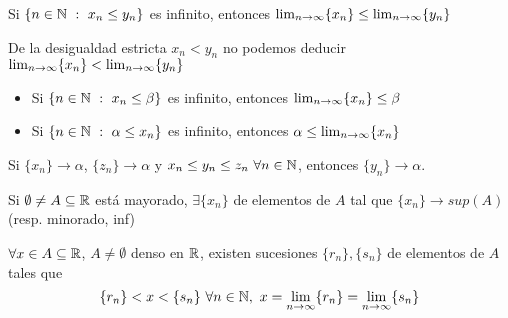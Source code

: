 Si $\{n\in\mathbb{N} \ : \ x_n\leq y_n\}$ es infinito, entonces $\lim_{\substack{n\rightarrow\infty}} \{x_n\} \leq \lim_{\substack{n\rightarrow\infty}} \{y_n\}$

De la desigualdad estricta $x_n<y_n$ no podemos deducir
$\lim_{\substack{n\rightarrow\infty}} \{x_n\} < \lim_{\substack{n\rightarrow\infty}} \{y_n\}$

\begin{itemize}
	\item Si $\{n\in\mathbb{N}\ : \ x_n\leq\beta \}$ es infinito, entonces $\lim_{\substack{n\rightarrow\infty}} \{x_n\}\leq\beta$
	\item Si $\{n\in\mathbb{N}\ : \ \alpha\leq x_n \}$ es infinito, entonces $\alpha \leq \lim_{\substack{n\rightarrow\infty}} \{x_n\}$	
\end{itemize}

Si $\{x_n\}\rightarrow \alpha$, $\{z_n\}\rightarrow \alpha$ y $x_n \leq y_n \leq z_n \ \forall n\in\mathbb{N}$, entonces $\{y_n\}\rightarrow \alpha$.

Si $\emptyset\not =A\subseteq\mathbb{R}$ está mayorado, $\exists\{x_n\}$ de elementos de $A$ tal que $\{x_n\}\rightarrow sup(A)$ (resp. minorado, inf)

$\forall x\in A\subseteq\mathbb{R}$, $A\not =\emptyset$ denso en $\mathbb{R}$, existen sucesiones $\{r_n\},\{s_n\}$ de elementos de $A$ tales que
$$ \{r_n\} < x < \{s_n\} \ \forall n\in\N, \ x=\limn \{r_n\} = \limn \{s_n\} $$